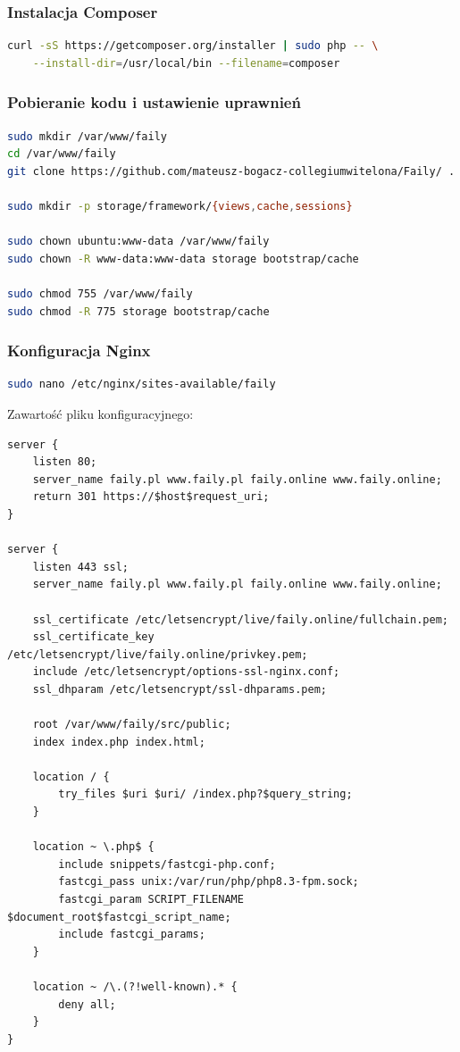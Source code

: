 \documentclass[12pt,a4paper]{article}
\begin{document}
\subsubsection{Instalacja Composer}
\begin{lstlisting}[language=bash, caption=Instalacja Composer]
curl -sS https://getcomposer.org/installer | sudo php -- \
    --install-dir=/usr/local/bin --filename=composer
\end{lstlisting}

\subsubsection{Pobieranie kodu i ustawienie uprawnień}
\begin{lstlisting}[language=bash, caption=Przygotowanie katalogów i uprawnień]
sudo mkdir /var/www/faily 
cd /var/www/faily
git clone https://github.com/mateusz-bogacz-collegiumwitelona/Faily/ .

sudo mkdir -p storage/framework/{views,cache,sessions}

sudo chown ubuntu:www-data /var/www/faily
sudo chown -R www-data:www-data storage bootstrap/cache

sudo chmod 755 /var/www/faily
sudo chmod -R 775 storage bootstrap/cache
\end{lstlisting}

\subsubsection{Konfiguracja Nginx}
\begin{lstlisting}[language=bash, caption=Utworzenie konfiguracji Nginx]
sudo nano /etc/nginx/sites-available/faily
\end{lstlisting}

Zawartość pliku konfiguracyjnego:
\begin{lstlisting}[caption=Konfiguracja Nginx z SSL]
server {
    listen 80;
    server_name faily.pl www.faily.pl faily.online www.faily.online;
    return 301 https://$host$request_uri;
}

server {
    listen 443 ssl;
    server_name faily.pl www.faily.pl faily.online www.faily.online;

    ssl_certificate /etc/letsencrypt/live/faily.online/fullchain.pem;
    ssl_certificate_key /etc/letsencrypt/live/faily.online/privkey.pem;
    include /etc/letsencrypt/options-ssl-nginx.conf;
    ssl_dhparam /etc/letsencrypt/ssl-dhparams.pem;

    root /var/www/faily/src/public;
    index index.php index.html;

    location / {
        try_files $uri $uri/ /index.php?$query_string;
    }

    location ~ \.php$ {
        include snippets/fastcgi-php.conf;
        fastcgi_pass unix:/var/run/php/php8.3-fpm.sock;
        fastcgi_param SCRIPT_FILENAME $document_root$fastcgi_script_name;
        include fastcgi_params;
    }

    location ~ /\.(?!well-known).* {
        deny all;
    }
}
\end{lstlisting}
\end{document}
